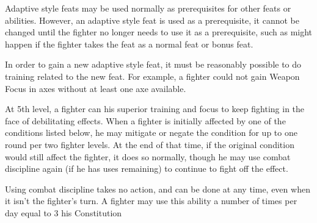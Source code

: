\par Adaptive style feats may be used normally as prerequisites for other feats or abilities.
However, an adaptive style feat is used as a prerequisite, it cannot be changed until the
fighter no longer needs to use it as a prerequisite, such as might happen if the fighter takes
the feat as a normal feat or bonus feat.
\par In order to gain a new adaptive style feat, it must be reasonably possible to do training related to the new feat. For example, a fighter could not gain Weapon Focus in axes without at least one axe available.

 At 5th level, a fighter can his superior training and focus to keep fighting in the face of debilitating effects. When a fighter is initially affected by one of the conditions listed below, he may mitigate or negate the condition for up to one round per two fighter levels. At the end of that time, if the original condition would still affect the fighter, it does so normally, though he may use combat discipline again (if he has uses remaining) to continue to fight off the effect.
\par Using combat discipline takes no action, and can be done at any time, even when it isn't the fighter's turn. A fighter may use this ability a number of times per day equal to 3 \add his Constitution

